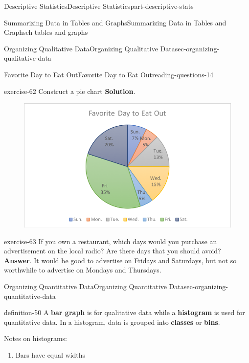 \documentclass[oneside,10pt,]{book}
\newcommand{\terminology}[1]{\textbf{#1}}
\numberwithin{equation}{section}
\begin{document}
\begin{partptx}{Descriptive Statistics}{}{Descriptive Statistics}{}{}{part-descriptive-stats}
\begin{chapterptx}{Summarizing Data in Tables and Graphs}{}{Summarizing Data in Tables and Graphs}{}{}{ch-tables-and-graphs}
\begin{sectionptx}{Organizing Qualitative Data}{}{Organizing Qualitative Data}{}{}{sec-organizing-qualitative-data}
\begin{reading-questions-subsection-numberless}{Favorite Day to Eat Out}{}{Favorite Day to Eat Out}{}{}{reading-questions-14}
\begin{divisionexercise}{5}{}{}{exercise-62}
\hypertarget{p-43}{}%
Construct a pie chart%
\textbf{Solution}.\hypertarget{solution-7}{}\quad%
\begin{figure}\centering\includegraphics[width=1\linewidth]{images/eat-out-pie-chart.png}
\end{figure}\end{divisionexercise}%
\begin{divisionexercise}{6}{}{}{exercise-63}%
\hypertarget{p-44}{}%
If you own a restaurant, which days would you purchase an advertisement on the local radio? Are there days that you should avoid?%
\textbf{Answer}.\hypertarget{answer-59}{}\quad%
\hypertarget{p-45}{}%
It would be good to advertise on Fridays and Saturdays, but not so worthwhile to advertise on Mondays and Thursdays.%
\end{divisionexercise}%
\end{reading-questions-subsection-numberless}
\end{sectionptx}
%
%
\typeout{************************************************}
\typeout{************************************************}
%
\begin{sectionptx}{Organizing Quantitative Data}{}{Organizing Quantitative Data}{}{}{sec-organizing-quantitative-data}
\begin{definition}{}{definition-50}%
\hypertarget{p-46}{}%
A \terminology{bar graph} is for qualitative data while a \terminology{histogram} is used for quantitative data. In a histogram, data is grouped into \terminology{classes} or \terminology{bins}.%
\par
\hypertarget{p-47}{}%
Notes on histograms:\leavevmode%
\begin{enumerate}
\item\hypertarget{li-21}{}Bars have equal widths%

\end{enumerate}
\end{definition}
\end{sectionptx}
\end{chapterptx}
\end{partptx}
\end{document}
